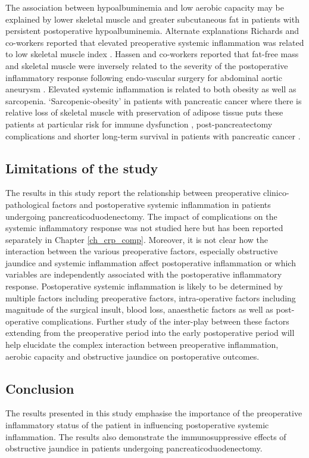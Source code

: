 The association between hypoalbuminemia and low aerobic capacity may be explained by lower skeletal muscle and greater subcutaneous fat in patients with persistent postoperative hypoalbuminemia.
Alternate explanations 
Richards and co-workers reported that elevated preoperative systemic inflammation was related to low skeletal muscle index \parencite{hassen_preoperative_2007}.
Hassen and co-workers reported that fat-free mass and skeletal muscle were inversely related to the severity of the postoperative inflammatory response following endo-vascular surgery for abdominal aortic aneurysm \parencite{hassen_preoperative_2007}.
Elevated systemic inflammation is related to both obesity as well as sarcopenia. 
`Sarcopenic-obesity' in patients with pancreatic cancer where there is relative loss of skeletal muscle with preservation of adipose tissue puts these patients at particular risk for immune dysfunction \parencite{berg_adipose_2005, reisinger_sarcopenia_2015}, post-pancreatectomy complications \parencite{joglekar_sarcopenia_2015} and shorter long-term survival in patients with pancreatic cancer \parencite{tan_sarcopenia_2009, peng_impact_2012}.

\subsection{Limitations of the study}

The results in this study report the relationship between preoperative clinico-pathological factors and postoperative systemic inflammation in patients undergoing pancreaticoduodenectomy. 
The impact of complications on the systemic inflammatory response was not studied here but has been reported separately in Chapter \ref{ch_crp_comp}. 
Moreover, it is not clear how the interaction between the various preoperative factors, especially obstructive jaundice and systemic inflammation affect postoperative inflammation or which variables are independently associated with the postoperative inflammatory response.
Postoperative systemic inflammation is likely to be determined by multiple factors including preoperative factors, intra-operative factors including magnitude of the surgical insult, blood loss, anaesthetic factors as well as post-operative complications.
Further study of the inter-play between these factors extending from the preoperative period into the early postoperative period will help elucidate the complex interaction between preoperative inflammation, aerobic capacity and obstructive jaundice on postoperative outcomes. 

\subsection{Conclusion}
The results presented in this study emphasise the importance of the preoperative inflammatory status of the patient in influencing postoperative systemic inflammation. 
The results also demonstrate the immunosuppressive effects of obstructive jaundice in patients undergoing pancreaticoduodenectomy. 

